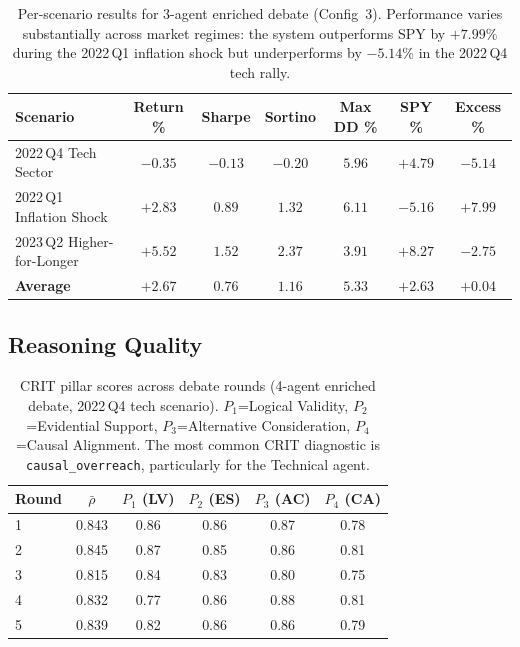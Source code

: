 \documentclass{article}
\begin{document}
\begin{table}[H]
\centering
\small
\begin{tabular}{@{}lcccccc@{}}
\toprule
\textbf{Scenario} & \textbf{Return \%} & \textbf{Sharpe} & \textbf{Sortino} & \textbf{Max DD \%} & \textbf{SPY \%} & \textbf{Excess \%} \\
\midrule
2022\,Q4 Tech Sector      & $-0.35$ & $-0.13$ & $-0.20$ & $5.96$ & $+4.79$ & $-5.14$ \\
2022\,Q1 Inflation Shock  & $+2.83$ & $0.89$  & $1.32$  & $6.11$ & $-5.16$ & $+7.99$ \\
2023\,Q2 Higher-for-Longer & $+5.52$ & $1.52$  & $2.37$  & $3.91$ & $+8.27$ & $-2.75$ \\
\midrule
\textbf{Average}          & $+2.67$ & $0.76$  & $1.16$  & $5.33$ & $+2.63$ & $+0.04$ \\
\bottomrule
\end{tabular}
\vspace{4pt}
\setlength{\belowcaptionskip}{-4pt}
\caption{Per-scenario results for 3-agent enriched debate (Config~3). Performance varies substantially across market regimes: the system outperforms SPY by $+7.99\%$ during the 2022\,Q1 inflation shock but underperforms by $-5.14\%$ in the 2022\,Q4 tech rally.}
\label{tab:per-scenario-debate}
\end{table}

\subsection{Reasoning Quality}
\label{app:crit-scores}

\begin{table}[H]
\centering
\small
\begin{tabular}{@{}lccccc@{}}
\toprule
\textbf{Round} & $\bar{\rho}$ & \textbf{$P_1$ (LV)} & \textbf{$P_2$ (ES)} & \textbf{$P_3$ (AC)} & \textbf{$P_4$ (CA)} \\
\midrule
1 & 0.843 & 0.86 & 0.86 & 0.87 & 0.78 \\
2 & 0.845 & 0.87 & 0.85 & 0.86 & 0.81 \\
3 & 0.815 & 0.84 & 0.83 & 0.80 & 0.75 \\
4 & 0.832 & 0.77 & 0.86 & 0.88 & 0.81 \\
5 & 0.839 & 0.82 & 0.86 & 0.86 & 0.79 \\
\bottomrule
\end{tabular}
\vspace{4pt}
\setlength{\belowcaptionskip}{-4pt}
\caption{CRIT pillar scores across debate rounds (4-agent enriched debate, 2022\,Q4 tech scenario). $P_1$=Logical Validity, $P_2$=Evidential Support, $P_3$=Alternative Consideration, $P_4$=Causal Alignment. The most common CRIT diagnostic is \texttt{causal\_overreach}, particularly for the Technical agent.}
\label{tab:crit-scores}
\end{table}
\end{document}

